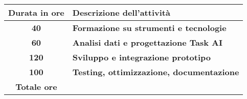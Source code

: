 

\begin{tabularx}{\textwidth}{|c|X|}
	\hline
	\textbf{Durata in ore} & \textbf{Descrizione dell'attività} \\\hline
	
	\textbf{40} & \textbf{Formazione su strumenti e tecnologie} \\	 
    \hline
    
    \textbf{60} & \textbf{Analisi dati e progettazione Task AI} \\
    \hline
    
    \textbf{120} & \textbf{Sviluppo e integrazione prototipo}  \\
    \hline
    
    \textbf{100} & \textbf{Testing, ottimizzazione, documentazione}  \\ %
    \hline
	
	\textbf{Totale ore} & \multicolumn{1}{c|}{\textbf{\totaleOre}} \\\hline
	
	
\end{tabularx}